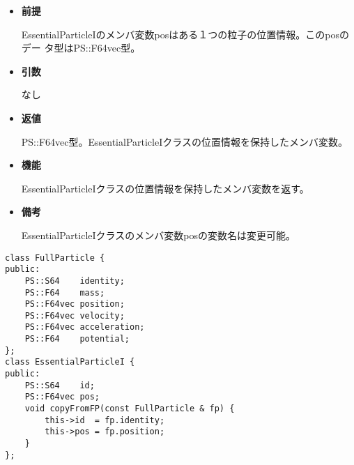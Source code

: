 \begin{itemize}

\item {\bf 前提}
  
  EssentialParticleIのメンバ変数posはある１つの粒子の位置情報。このposのデー
  タ型はPS::F64vec型。
  
\item {\bf 引数}

  なし
  
\item {\bf 返値}

  PS::F64vec型。EssentialParticleIクラスの位置情報を保持したメンバ変数。
  
\item {\bf 機能}

  EssentialParticleIクラスの位置情報を保持したメンバ変数を返す。
  
\item {\bf 備考}

  EssentialParticleIクラスのメンバ変数posの変数名は変更可能。

\end{itemize}


\begin{screen}
\begin{verbatim}
class FullParticle {
public:
    PS::S64    identity;
    PS::F64    mass;
    PS::F64vec position;
    PS::F64vec velocity;
    PS::F64vec acceleration;
    PS::F64    potential;
};
class EssentialParticleI {
public:
    PS::S64    id;
    PS::F64vec pos;
    void copyFromFP(const FullParticle & fp) {
        this->id  = fp.identity;
        this->pos = fp.position;
    }
};
\end{verbatim}
\end{screen}

